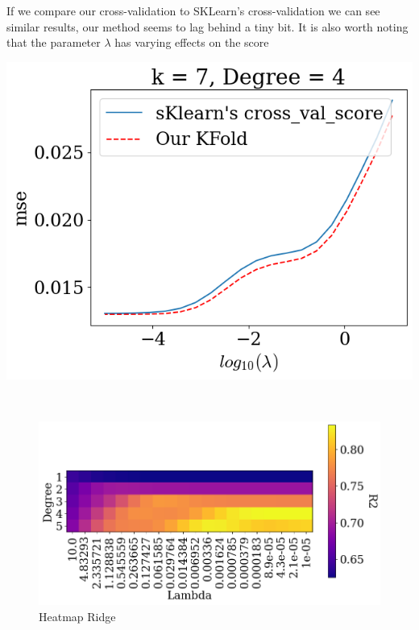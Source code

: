\documentclass[twoside,11pt]{report}
\begin{document}
\begin{minipage}[!t]{.48\linewidth}
    If we compare our cross-validation to SKLearn's cross-validation we can see similar results,
    our method seems to lag behind a tiny bit. It is also worth noting that the parameter $\lambda$ has
    varying effects on the score
\end{minipage}
\hspace{4mm}
\begin{minipage}[!t]{.48\linewidth}
    \begin{center}
        \includegraphics[width=1.0\textwidth]{../runsAndAdditions/crossvalOursVsSklearn.png}
    \end{center}
\end{minipage}\\
\begin{figure}
    \begin{center}
        \includegraphics[width=1.0\textwidth]{../runsAndAdditions/heatmapCrossval.png}
    \end{center}
    \caption{Heatmap Ridge}\label{fig:heatmapCrossval}
\end{figure}
\end{document}
